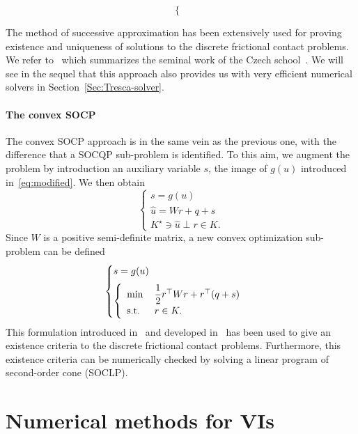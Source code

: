 {\begin{equation}
\begin{cases}
  \end{cases}
\end{equation}

The method of successive approximation has been extensively used for proving existence and uniqueness of solutions to the discrete frictional contact problems. We refer to~\cite{Haslinger.ea1996} which summarizes the seminal work of the Czech school~\cite{Necas.ea1980,Haslinger1983,Haslinger1984}. We will see in the sequel that this approach also provides us with very efficient numerical solvers in Section~\ref{Sec:Tresca-solver}.


\paragraph{The convex SOCP} The convex SOCP approach is in the same vein as the previous one, with the difference that a SOCQP sub-problem is identified.
To this aim, we augment the problem by introduction an auxiliary variable $s$, the image of $g(u)$ introduced in~\eqref{eq:modified}.
We then obtain
\begin{equation}\label{eq:ACLM-2}
  \begin{cases}
    s = g(u) \\[2mm]
    \hat u = W r + q + s  \\[2mm]
    K^\star \ni {\hat u} \perp r \in K.
  \end{cases}
\end{equation} 
Since $W$ is a positive semi-definite matrix, a new convex optimization sub-problem can be defined 
\begin{equation}\label{eq:ACLM-3}
  \begin{cases}
    s = g(u) \\[2mm]
    \left\{
      \begin{array}{ll}
        \min\,&\Frac 1 2 r^\top W r + r^\top (q + s)  \\
        \text{s.t. } & r \in K.
      \end{array}
    \right.
  \end{cases}
\end{equation} 
This formulation introduced in~\cite{Cadoux2009} and developed in~\cite{Acary.Cadoux2013,Acary.ea_ZAMM2011} has been used to give an existence criteria to the discrete frictional contact problems. Furthermore, this existence criteria can be numerically checked by solving a linear program of second-order cone (SOCLP).

\section{Numerical methods for VIs}
\label{sec:numericalmethods,vi}


}
